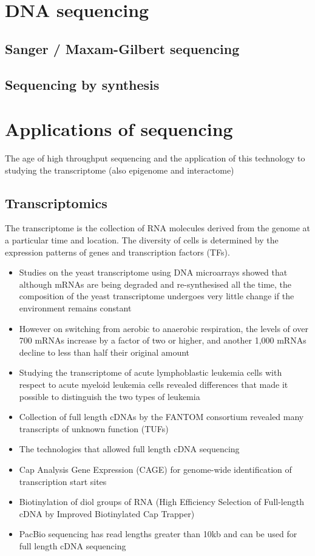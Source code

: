 \section{DNA sequencing}

\subsection{Sanger / Maxam-Gilbert sequencing}

\subsection{Sequencing by synthesis}

\section{Applications of sequencing}

The age of high throughput sequencing and the application of this technology to studying the transcriptome (also epigenome and interactome)

\subsection{Transcriptomics}

The transcriptome is the collection of RNA molecules derived from the genome at a particular time and location. The diversity of cells is determined by the expression patterns of genes and transcription factors (TFs).

\begin{itemize}

   \item Studies on the yeast transcriptome using DNA microarrays showed that although mRNAs are being degraded and re-synthesised all the time, the composition of the yeast transcriptome undergoes very little change if the environment remains constant
   \item However on switching from aerobic to anaerobic respiration, the levels of over 700 mRNAs increase by a factor of two or higher, and another 1,000 mRNAs decline to less than half their original amount
   \item Studying the transcriptome of acute lymphoblastic leukemia cells with respect to acute myeloid leukemia cells revealed differences that made it possible to distinguish the two types of leukemia
   \item Collection of full length cDNAs by the FANTOM consortium revealed many transcripts of unknown function (TUFs)
   \item The technologies that allowed full length cDNA sequencing
   \item Cap Analysis Gene Expression (CAGE) for genome-wide identification of transcription start sites
   \item Biotinylation of diol groups of RNA (High Efficiency Selection of Full-length cDNA by Improved Biotinylated Cap Trapper)
   \item PacBio sequencing has read lengths greater than 10kb and can be used for full length cDNA sequencing

\end{itemize}


